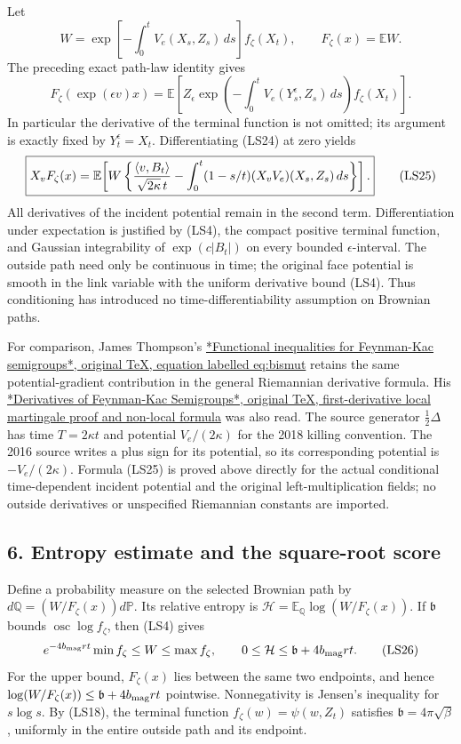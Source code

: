 \documentclass[11pt]{article}
\begin{document}
Let
\[
 W=\exp\!\left[-\int_0^tV_e(X_s,Z_s)\,ds\right]f_\zeta(X_t),
 \qquad F_\zeta(x)=\mathbb EW .
 \]
The preceding exact path-law identity gives
\[
 F_\zeta(\exp(\epsilon v)x)
 =\mathbb E\!\left[
 Z_\epsilon\exp\!\left(-\int_0^tV_e(Y_s^\epsilon,Z_s)\,ds\right)
                         f_\zeta(X_t)\right].
 \tag{LS24}
\]
In particular the derivative of the terminal function is not
omitted; its argument is exactly fixed by \(Y_t^\epsilon=X_t\).
Differentiating (LS24) at zero yields
\[
 \boxed{X_vF_\zeta(x)=
 \mathbb E\!\left[W\left\{
 {\langle v,B_t\rangle\over\sqrt{2\kappa}\,t}
       -\int_0^t(1-s/t)(X_vV_e)(X_s,Z_s)\,ds
                         \right\}\right].}
 \tag{LS25}
\]
All derivatives of the incident potential remain in the second
term. Differentiation under expectation is justified by (LS4),
the compact positive terminal function, and Gaussian integrability
of \(\exp(c|B_t|)\) on every bounded \(\epsilon\)-interval.
The outside path need only be continuous in time; the original
face potential is smooth in the link variable with the uniform
derivative bound (LS4). Thus conditioning has introduced no
time-differentiability assumption on Brownian paths.

For comparison, James Thompson's
\href{https://arxiv.org/src/1811.03471v1}{*Functional inequalities for Feynman-Kac semigroups*, original TeX, equation labelled eq:bismut}
retains the same potential-gradient contribution in the general
Riemannian derivative formula. His
\href{https://arxiv.org/src/1611.04373v1}{*Derivatives of Feynman-Kac Semigroups*, original TeX, first-derivative local martingale proof and non-local formula}
was also read. The source generator \(\tfrac12\Delta\) has
time \(T=2\kappa t\) and potential \(V_e/(2\kappa)\) for the
2018 killing convention. The 2016 source writes a plus sign
for its potential, so its corresponding potential is
\(-V_e/(2\kappa)\). Formula (LS25) is proved above directly for
the actual conditional time-dependent incident potential and the
original left-multiplication fields; no outside derivatives or
unspecified Riemannian constants are imported.

\subsection*{6. Entropy estimate and the square-root score}

Define a probability measure on the selected Brownian path by
\(d\mathbb Q=(W/F_\zeta(x))d\mathbb P\).
Its relative entropy is
\(\mathcal H=\mathbb E_{\mathbb Q}\log(W/F_\zeta(x))\).
If \(\mathfrak b\) bounds \(\operatorname{osc}\log f_\zeta\), then (LS4)
gives
\[
 e^{-4b_{\rm mag}rt}\min f_\zeta\le W\le\max f_\zeta,
 \qquad 0\le\mathcal H\le \mathfrak b+4b_{\rm mag}rt.
 \tag{LS26}
\]
For the upper bound, \(F_\zeta(x)\) lies between the same two
endpoints, and hence
\(\log(W/F_\zeta(x))\le\mathfrak b+4b_{\rm mag}rt\) pointwise.
Nonnegativity is Jensen's inequality for \(s\log s\).
By (LS18), the terminal function
\(f_\zeta(w)=\psi(w,Z_t)\) satisfies
\(\mathfrak b=4\pi\sqrt\beta\),
uniformly in the entire outside path and its endpoint.
\end{document}
